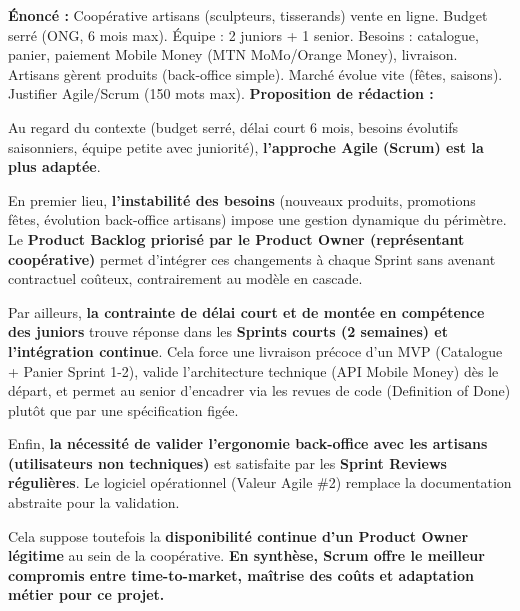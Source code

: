 \documentclass[11pt]{article}
\begin{document}
\begin{exoresolu}
\textbf{Énoncé :} Coopérative artisans (sculpteurs, tisserands) vente en ligne. Budget serré (ONG, 6 mois max). Équipe : 2 juniors + 1 senior. Besoins : catalogue, panier, paiement Mobile Money (MTN MoMo/Orange Money), livraison. Artisans gèrent produits (back-office simple). Marché évolue vite (fêtes, saisons). Justifier Agile/Scrum (150 mots max).
\tcblower
\textbf{Proposition de rédaction :}

Au regard du contexte (budget serré, délai court 6 mois, besoins évolutifs saisonniers, équipe petite avec juniorité), \textbf{l'approche Agile (Scrum) est la plus adaptée}.

En premier lieu, \textbf{l'instabilité des besoins} (nouveaux produits, promotions fêtes, évolution back-office artisans) impose une gestion dynamique du périmètre. Le \textbf{Product Backlog priorisé par le Product Owner (représentant coopérative)} permet d'intégrer ces changements à chaque Sprint sans avenant contractuel coûteux, contrairement au modèle en cascade.

Par ailleurs, \textbf{la contrainte de délai court et de montée en compétence des juniors} trouve réponse dans les \textbf{Sprints courts (2 semaines) et l'intégration continue}. Cela force une livraison précoce d'un MVP (Catalogue + Panier Sprint 1-2), valide l'architecture technique (API Mobile Money) dès le départ, et permet au senior d'encadrer via les revues de code (Definition of Done) plutôt que par une spécification figée.

Enfin, \textbf{la nécessité de valider l'ergonomie back-office avec les artisans (utilisateurs non techniques)} est satisfaite par les \textbf{Sprint Reviews régulières}. Le logiciel opérationnel (Valeur Agile \#2) remplace la documentation abstraite pour la validation.

Cela suppose toutefois la \textbf{disponibilité continue d'un Product Owner légitime} au sein de la coopérative. \textbf{En synthèse, Scrum offre le meilleur compromis entre time-to-market, maîtrise des coûts et adaptation métier pour ce projet.}
\end{exoresolu}
\end{document}
